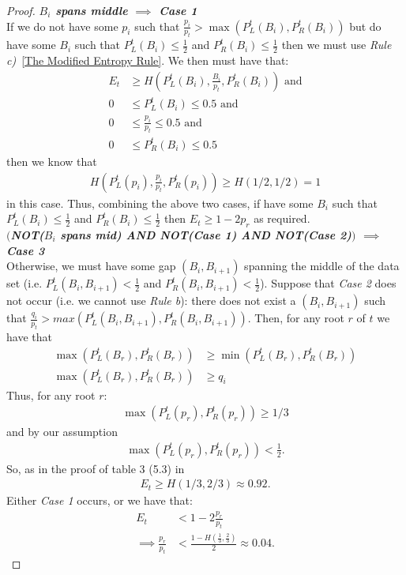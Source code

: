 \documentclass[letterpaper,12pt,titlepage,oneside,final]{book}
\theoremstyle{plain}
\begin{document}
\begin{proof}
\noindent\textbf{\textit{$B_i$ spans middle $\implies$ Case 1}} \\
If we do not have some $p_i$ such that $\frac{p_i}{p_t} > \max(P^t_L(B_i), P^t_R(B_i))$ but do have some $B_i$ such that $P^t_L(B_i) \leq \frac{1}{2}$ and $P^t_R(B_i) \leq \frac{1}{2}$ then we must use \textit{Rule c)}~\ref{The Modified Entropy Rule}. We then must have that:
\begin{align*}
 E_t &\geq H(P^t_L(B_i), \frac{B_i}{p_t} , P^t_R(B_i)) \text{ and} \\
 0 &\leq P^t_L(B_i) \leq 0.5 \text{ and}\\
 0 &\leq \frac{p_i}{p_t} \leq 0.5 \text{ and}\\
 0 &\leq P^t_R(B_i) \leq 0.5
\end{align*} 
   then we know that \\
\begin{align*}
H(P^t_L(p_i), \frac{p_i}{p_t} , P^t_R(p_i)) \geq H(1/2, 1/2) = 1
\end{align*}
in this case.
 Thus, combining the above two cases, if have some $B_i$ such that $P^t_L(B_i) \leq \frac{1}{2}$ and $P^t_R(B_i) \leq \frac{1}{2}$ then $E_t \geq 1-2p_r$ as required. \\

\noindent\textbf{\textit{$\big($NOT($B_i$ spans mid) AND NOT(Case 1) AND NOT(Case 2)$\big)$ $\implies$ Case 3}} \\
Otherwise, we must have some gap $(B_i, B_{i+1})$ spanning the middle of the data set (i.e. $P^t_L(B_i, B_{i+1}) < \frac{1}{2}$ and $P^t_R(B_i, B_{i+1}) < \frac{1}{2}$). Suppose that \textit{Case 2} does not occur (i.e. we cannot use \textit{Rule b}): there does not exist a $(B_i, B_{i+1})$ such that $\frac{q_i}{p_t} > max(P^t_L(B_i, B_{i+1}), P^t_R(B_i, B_{i+1}))$. Then, for any root $r$ of $t$ we have that \\
\begin{align*}
\max(P^t_L(B_r), P^t_R(B_r)) &\geq \min(P^t_L(B_r), P^t_R(B_r))\\ 
\max(P^t_L(B_r), P^t_R(B_r)) &\geq q_i
\end{align*}
Thus, for any root $r$:
\begin{align*}
\max(P^t_L(p_r), P^t_R(p_r)) \geq 1/3
\end{align*}
 and by our assumption 
\begin{align*}
\max(P^t_L(p_r), P^t_R(p_r)) < \frac{1}{2}.
\end{align*}
 So, as in the proof of table 3 (5.3) in \cite{guttler1980binary}\\
\begin{align*}
E_t \geq H(1/3, 2/3) \approx 0.92.
\end{align*}
Either \textit{Case 1} occurs, or we have that:
\begin{align*}
E_t &< 1-2\frac{p_r}{p_t} \\
\implies \frac{p_r}{p_t} &< \frac{1-H(\frac{1}{3}, \frac{2}{3})}{2} \approx 0.04.
\end{align*}


\end{proof}
\end{document}
